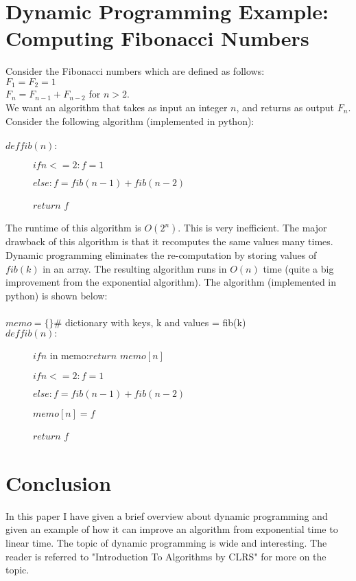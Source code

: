 \documentclass[8pt]{article}
\begin{document}
\section{Dynamic Programming Example: Computing Fibonacci Numbers}
Consider the Fibonacci numbers which are defined as follows: \\
$F_1 = F_2 = 1$\\$F_n = F_{n-1} + F_{n-2} $ for $n > 2.$\\
We want an algorithm that takes as input an integer $n$, and returns as output $F_{n}$. Consider the following algorithm (implemented in python):\\\\
$def fib(n):$
\begin{description}
\item[ ] $if n <= 2: f = 1$
\item[ ]$else: f = fib(n - 1) + fib(n - 2)$
\item[ ] $return $ $f$
\end{description}
The runtime of this algorithm is $O(2 ^ n)$. This is very inefficient. The major drawback of this algorithm is that it recomputes the same values many times. Dynamic programming eliminates  the re-computation by storing values of $fib(k)$ in an array. The resulting algorithm runs in $O(n)$ time (quite a big improvement from the exponential algorithm). The algorithm (implemented in python) is shown below:\\\\
$memo = \{\} $\# dictionary with keys, k and values = fib(k)\\
$def fib(n):$
\begin{description}
\item[ ] $if n $ in memo:$return $ $memo[n]$
\item[ ] $if n <= 2: f = 1$
\item[ ] $else: f = fib(n - 1) + fib(n - 2)$
\item[ ] $memo[n] = f$
\item[ ] $return $ $f$
\end{description}

\section{Conclusion}
In this paper I have given a brief overview about dynamic programming and given an example of
how it can improve an algorithm from exponential time to linear time. The topic of dynamic
programming is wide and interesting. The reader is referred to "Introduction To Algorithms by CLRS" for more on the topic.
\end{document}
